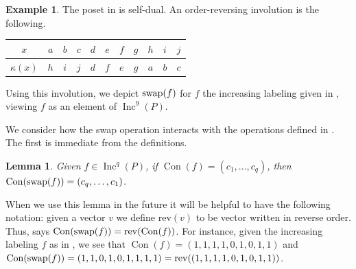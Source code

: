 \documentclass[11pt]{amsart}
\newtheorem{lemma}[theorem]{Lemma}
\theoremstyle{definition}
\newtheorem{example}[theorem]{Example}
\newcommand{\rev}{\mathrm{rev}}
\DeclareMathOperator{\Inc}{\mathrm{Inc}}
\DeclareMathOperator{\Con}{\mathrm{Con}}
\newcommand{\swap}{\textnormal{swap}}
\begin{document}
\begin{example}
The poset in  is self-dual. An order-reversing involution is the following.

\begin{center}
\begin{tabular}{c||*{10}{c|}}
$x$ & $a$ & $b$ & $c$ & $d$ & $e$ & $f$ & $g$ & $h$ & $i$ & $j$ \\\hline
$\kappa(x)$ & $h$ & $i$ & $j$ & $d$ & $f$ & $e$ & $g$ &  $a$ & $b$ & $c$\\
\end{tabular}
\end{center}

Using this involution, we depict $\swap(f)$ for $f$ the increasing labeling given in , viewing $f$ as an element of $\Inc^9(P)$.

\begin{center}
\end{center}

\end{example}
 

We consider how the swap operation interacts with the operations defined in .
The first is immediate from the definitions.

\begin{lemma}\label{lem:SwapOnContent}
Given $f \in \Inc^q(P)$, if $\Con(f) = (c_1,\ldots,c_q)$, then $\Con(\swap(f)) = (c_q,\ldots,c_1)$.
\end{lemma}


When we use this lemma in the future it will be helpful to have the following notation: given a vector $v$ we define $\rev(v)$ to be vector written in reverse order.  Thus,  says $\Con(\swap(f))=\rev(\Con(f))$. For instance, given the increasing labeling $f$ as in , we see that $\Con(f) = (1,1,1,1,0,1,0,1,1)$ and $\Con(\swap(f)) = (1,1,0,1,0,1,1,1,1) = \rev((1,1,1,1,0,1,0,1,1))$. 
\end{document}
